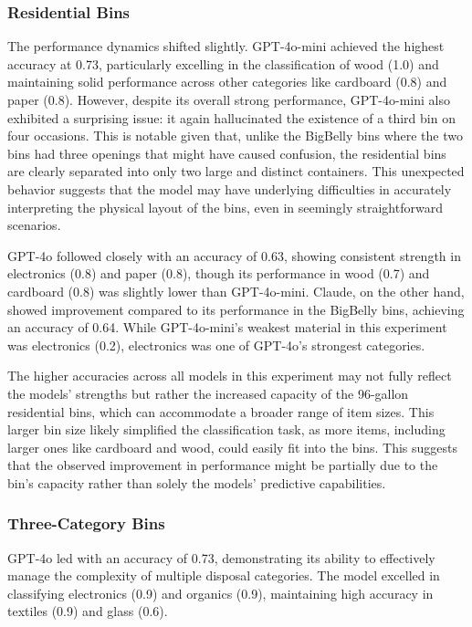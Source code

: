\documentclass{article}
\begin{document}
\subsubsection*{Residential Bins} The performance dynamics shifted slightly. GPT-4o-mini achieved the highest accuracy at 0.73, particularly excelling in the classification of wood (1.0) and maintaining solid performance across other categories like cardboard (0.8) and paper (0.8). However, despite its overall strong performance, GPT-4o-mini also exhibited a surprising issue: it again hallucinated the existence of a third bin on four occasions. This is notable given that, unlike the BigBelly bins where the two bins had three openings that might have caused confusion, the residential bins are clearly separated into only two large and distinct containers. This unexpected behavior suggests that the model may have underlying difficulties in accurately interpreting the physical layout of the bins, even in seemingly straightforward scenarios.

GPT-4o followed closely with an accuracy of 0.63, showing consistent strength in electronics (0.8) and paper (0.8), though its performance in wood (0.7) and cardboard (0.8) was slightly lower than GPT-4o-mini. Claude, on the other hand, showed improvement compared to its performance in the BigBelly bins, achieving an accuracy of 0.64. While GPT-4o-mini’s weakest material in this experiment was electronics (0.2), electronics was one of GPT-4o’s strongest categories.

The higher accuracies across all models in this experiment may not fully reflect the models’ strengths but rather the increased capacity of the 96-gallon residential bins, which can accommodate a broader range of item sizes. This larger bin size likely simplified the classification task, as more items, including larger ones like cardboard and wood, could easily fit into the bins. This suggests that the observed improvement in performance might be partially due to the bin’s capacity rather than solely the models’ predictive capabilities.

\subsubsection*{Three-Category Bins} GPT-4o led with an accuracy of 0.73, demonstrating its ability to effectively manage the complexity of multiple disposal categories. The model excelled in classifying electronics (0.9) and organics (0.9), maintaining high accuracy in textiles (0.9) and glass (0.6).
\end{document}
